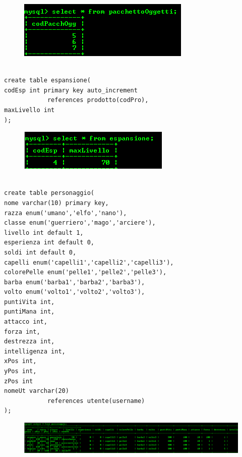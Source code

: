 \begin{figure}[H]
\centering
\includegraphics[width=0.7\linewidth]{immagini/4}
\caption{}
\label{fig:1}
\end{figure}

\begin{verbatim}

create table espansione( 
codEsp int primary key auto_increment 
			references prodotto(codPro), 
maxLivello int
);
\end{verbatim}

\begin{figure}[H]
\centering
\includegraphics[width=0.7\linewidth]{immagini/5}
\caption{}
\label{fig:1}
\end{figure}

\begin{verbatim}

create table personaggio( 
nome varchar(10) primary key,
razza enum('umano','elfo','nano'), 
classe enum('guerriero','mago','arciere'), 
livello int default 1,
esperienza int default 0,
soldi int default 0, 
capelli enum('capelli1','capelli2','capelli3'), 
colorePelle enum('pelle1','pelle2','pelle3'), 
barba enum('barba1','barba2','barba3'), 
volto enum('volto1','volto2','volto3'), 
puntiVita int, 
puntiMana int, 
attacco int, 
forza int, 
destrezza int, 
intelligenza int, 
xPos int, 
yPos int, 
zPos int
nomeUt varchar(20)
			references utente(username)
);
\end{verbatim}

\begin{figure}[H]
\centering
\includegraphics[width=0.7\linewidth]{immagini/6}
\caption{}
\label{fig:1}
\end{figure}

